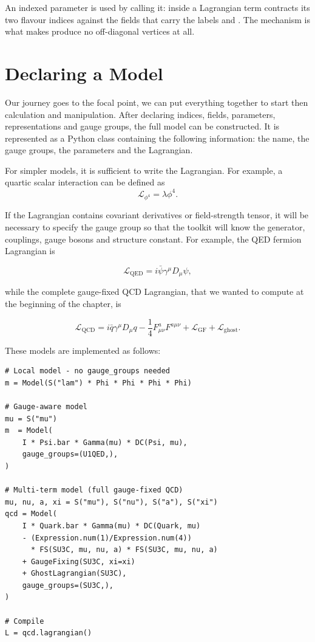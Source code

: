 \noindent An indexed parameter is used by calling it:  inside a
Lagrangian term contracts its two flavour indices against the fields that
carry the labels  and . The  mechanism is what
makes  produce no off-diagonal vertices at all.


\section{Declaring a Model}
\label{sec:feynpy-model}
Our journey goes to the focal point, we can put everything together to start then calculation and manipulation. After declaring indices, fields, parameters, representations and gauge groups, the full model can be constructed. It is represented as a Python class containing the following information: the name, the gauge groups, the parameters and the Lagrangian.

For simpler models, it is sufficient to write the Lagrangian. For example, a quartic scalar interaction can be defined as
\begin{equation}
\mathcal{L}_{\phi^4} = \lambda \phi^4 .
\end{equation}

If the Lagrangian contains covariant derivatives or field-strength tensor, it will be necessary to specify the gauge group so that the toolkit will know the generator, couplings, gauge bosons and structure constant. For example, the QED fermion Lagrangian is

\begin{equation}
\mathcal{L}_{\mathrm{QED}}
= i \bar{\psi}\gamma^\mu D_\mu\psi ,
\end{equation}

while the complete gauge-fixed QCD Lagrangian, that we wanted to compute at the beginning of the chapter, is

\begin{equation}
\mathcal{L}_{\mathrm{QCD}}
=
i\bar{q}\gamma^\mu D_\mu q
- \frac{1}{4}F_{\mu\nu}^{a}F^{a\mu\nu}
+ \mathcal{L}_{\mathrm{GF}}
+ \mathcal{L}_{\mathrm{ghost}} .
\end{equation}

These models are implemented as follows:


\begin{verbatim}
# Local model - no gauge_groups needed
m = Model(S("lam") * Phi * Phi * Phi * Phi)

# Gauge-aware model
mu = S("mu")
m  = Model(
    I * Psi.bar * Gamma(mu) * DC(Psi, mu),
    gauge_groups=(U1QED,),
)

# Multi-term model (full gauge-fixed QCD)
mu, nu, a, xi = S("mu"), S("nu"), S("a"), S("xi")
qcd = Model(
    I * Quark.bar * Gamma(mu) * DC(Quark, mu)
    - (Expression.num(1)/Expression.num(4))
      * FS(SU3C, mu, nu, a) * FS(SU3C, mu, nu, a)
    + GaugeFixing(SU3C, xi=xi)
    + GhostLagrangian(SU3C),
    gauge_groups=(SU3C,),
)

# Compile
L = qcd.lagrangian()
\end{verbatim}

